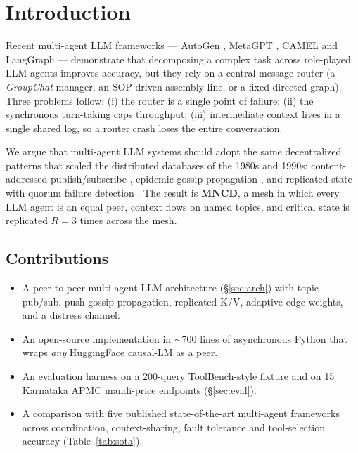 \documentclass[conference]{IEEEtran}
\begin{document}
\section{Introduction}

Recent multi-agent LLM frameworks --- AutoGen \cite{wu2023autogen},
MetaGPT \cite{hong2024metagpt}, CAMEL \cite{li2023camel} and
LangGraph --- demonstrate that decomposing a complex task across role-played
LLM agents improves accuracy, but they rely on a central message router (a
\emph{GroupChat} manager, an SOP-driven assembly line, or a fixed directed
graph). Three problems follow: (i) the router is a single point of failure;
(ii) the synchronous turn-taking caps throughput; (iii) intermediate context
lives in a single shared log, so a router crash loses the entire conversation.

We argue that multi-agent LLM systems should adopt the same decentralized
patterns that scaled the distributed databases of the 1980s and 1990s:
content-addressed publish/subscribe \cite{eugster2003}, epidemic gossip
propagation \cite{demers1987}, and replicated state with quorum failure
detection \cite{vanrenesse1998}. The result is \textbf{MNCD}, a mesh in
which every LLM agent is an equal peer, context flows on named topics, and
critical state is replicated $R{=}3$ times across the mesh.

\subsection*{Contributions}
\begin{itemize}
  \item A peer-to-peer multi-agent LLM architecture (\S\ref{sec:arch}) with
        topic pub/sub, push-gossip propagation, replicated K/V, adaptive
        edge weights, and a distress channel.
  \item An open-source implementation in $\sim$700 lines of asynchronous
        Python that wraps \emph{any} HuggingFace causal-LM as a peer.
  \item An evaluation harness on a 200-query ToolBench-style fixture and on
        15 Karnataka APMC mandi-price endpoints (\S\ref{sec:eval}).
  \item A comparison with five published state-of-the-art multi-agent
        frameworks across coordination, context-sharing, fault tolerance and
        tool-selection accuracy (Table~\ref{tab:sota}).
\end{itemize}
\end{document}

